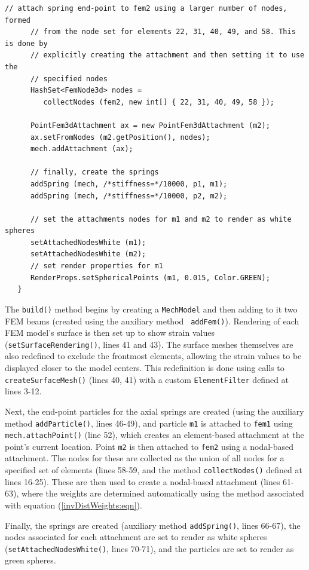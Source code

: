 \begin{lstlisting}[]
      // attach spring end-point to fem2 using a larger number of nodes, formed
      // from the node set for elements 22, 31, 40, 49, and 58. This is done by
      // explicitly creating the attachment and then setting it to use the
      // specified nodes
      HashSet<FemNode3d> nodes =
         collectNodes (fem2, new int[] { 22, 31, 40, 49, 58 });

      PointFem3dAttachment ax = new PointFem3dAttachment (m2);
      ax.setFromNodes (m2.getPosition(), nodes);
      mech.addAttachment (ax);

      // finally, create the springs
      addSpring (mech, /*stiffness=*/10000, p1, m1);
      addSpring (mech, /*stiffness=*/10000, p2, m2);

      // set the attachments nodes for m1 and m2 to render as white spheres
      setAttachedNodesWhite (m1);
      setAttachedNodesWhite (m2);
      // set render properties for m1
      RenderProps.setSphericalPoints (m1, 0.015, Color.GREEN);
   }
\end{lstlisting}
\lstset{numbers=none}
The {\tt build()} method begins by creating a {\tt MechModel} and then
adding to it two FEM beams (created using the auxiliary method {\tt
addFem()}). Rendering of each FEM model's surface is then set up to
show strain values ({\tt setSurfaceRendering()}, lines 41 and 43).
The surface meshes themselves are also redefined to exclude the
frontmost elements, allowing the strain values to be displayed closer to the
model centers. This redefinition is done using calls to {\tt
createSurfaceMesh()} (lines 40, 41) with a custom {\tt ElementFilter}
defined at lines 3-12.

Next, the end-point particles for the axial springs are created (using
the auxiliary method {\tt addParticle()}, lines
46-49), and particle {\tt m1} is attached to {\tt fem1} using {\tt
mech.attachPoint()} (line 52), which creates an element-based
attachment at the point's current location. Point {\tt m2} is then
attached to {\tt fem2} using a nodal-based attachment.  The nodes for
these are collected as the union of all nodes for a specified set of
elements (lines 58-59, and the method {\tt collectNodes()} defined at
lines 16-25). These are then used to create a nodal-based attachment
(lines 61-63), where the weights are determined automatically using
the method associated with equation (\ref{invDistWeights:eqn}).

Finally, the springs are created (auxiliary method {\tt addSpring()},
lines 66-67), the nodes associated for each attachment are set to
render as white spheres ({\tt setAttachedNodesWhite()}, lines 70-71),
and the particles are set to render as green spheres.

